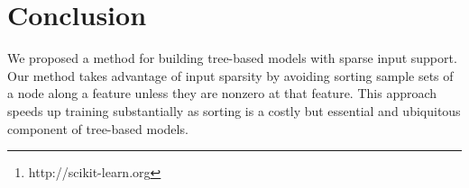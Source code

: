 \documentclass{acm_proc_article-sp}
\begin{document}
\maketitle
\begin{abstract}
  Many machine learning tasks such as text annotation usually require
  training over very big datasets, e.g., millions of web documents,
  that can be represented in a sparse input space. State-of-the-art
  tree-based ensemble algorithms cannot scale to such datasets, since
  they include operations whose running time is a function of the
  input space size rather than a function of the non-zero input
  elements. 
  In this paper, we propose an efficient splitting algorithm to
  leverage input sparsity within decision tree
  methods. 
  Our algorithm improves training time over sparse datasets by more
  than two orders of magnitude and it will be incorporated in the next
  version of \emph{scikit-learn}\footnote{http://scikit-learn.org},
  the most popular open source Python machine learning library.
\end{abstract}











\section{Conclusion}
\label{sec:conclusion}
We proposed a method for building tree-based models with sparse input
support.  Our method takes advantage of input sparsity by avoiding
sorting sample sets of a node along a feature unless they are nonzero
at that feature. This approach speeds up training substantially as
sorting is a costly but essential and ubiquitous component of
tree-based models.
\end{document}
